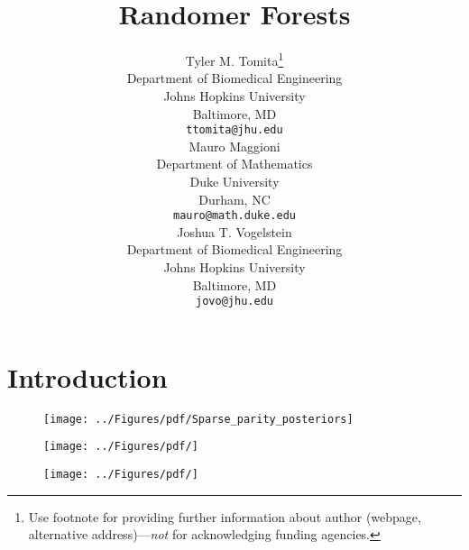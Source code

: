 \documentclass{article} %
\title{Randomer Forests}
\author{
Tyler M. Tomita\thanks{ Use footnote for providing further information
about author (webpage, alternative address)---\emph{not} for acknowledging
funding agencies.} \\
Department of Biomedical Engineering\\
Johns Hopkins University\\
Baltimore, MD \\
\texttt{ttomita@jhu.edu} \\
\And
Mauro Maggioni \\
Department of Mathematics \\
Duke University \\
Durham, NC \\
\texttt{mauro@math.duke.edu} \\
\And
Joshua T. Vogelstein \\
Department of Biomedical Engineering \\
Johns Hopkins University \\
Baltimore, MD \\
\texttt{jovo@jhu.edu} \\
}
\begin{document}
\maketitle
\vspace{-15pt}
\begin{abstract}

\end{abstract}

\section{Introduction}






\begin{figure}[h]
\begin{center}
\texttt{[image: ../Figures/pdf/Sparse\_parity\_posteriors]}
\end{center}
\caption{}
\label{fig:posteriors}
\end{figure}

\begin{figure}[h]
\begin{center}
\texttt{[image: ../Figures/pdf/]}
\end{center}
\caption{}
\label{fig:sim}
\end{figure}

\begin{figure}[h]
\begin{center}
\texttt{[image: ../Figures/pdf/]}
\end{center}
\caption{}
\label{fig:transformations}
\end{figure}
\end{document}
